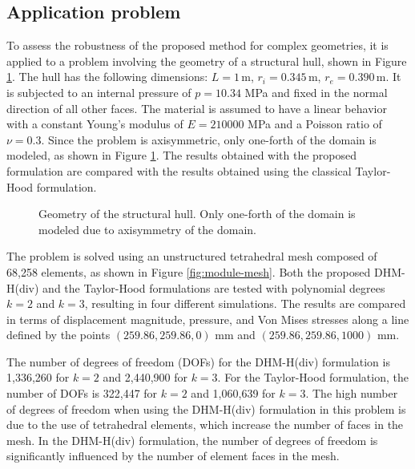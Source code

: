\documentclass[english,11pt,3p,number,sort&compress]{elsarticle}
\newcommand{\m}{\,\text{m}}
\begin{document}
\subsection{Application problem\label{subsec:module}}

To assess the robustness of the proposed method for complex geometries, it is applied to a problem involving the geometry of a structural hull, shown in Figure \ref{fig:module-geometry}. The hull has the following dimensions: $L=1\m$, $r_i=0.345\m$, $r_e=0.390\m$. It is subjected to an internal pressure of $p=10.34$ MPa and fixed in the normal direction of all other faces. The material is assumed to have a linear behavior with a constant Young's modulus of $E=210000$ MPa and a Poisson ratio of $\nu=0.3$. Since the problem is axisymmetric, only one-forth of the domain is modeled, as shown in Figure \ref{fig:module-geometry}. The results obtained with the proposed formulation are compared with the results obtained using the classical Taylor-Hood formulation.

\begin{figure}[h]
    \centering
    \def\svgwidth{450pt} 
    
    \caption{Geometry of the structural hull. Only one-forth of the domain is modeled due to axisymmetry of the domain.}
    \label{fig:module-geometry}
\end{figure}

The problem is solved using an unstructured tetrahedral mesh composed of 68,258 elements, as shown in Figure \ref{fig:module-mesh}. Both the proposed DHM-H(div) and the Taylor-Hood formulations are tested with polynomial degrees $k=2$ and $k=3$, resulting in four different simulations. The results are compared in terms of displacement magnitude, pressure, and Von Mises stresses along a line defined by the points $(259.86, 259.86, 0)$ mm and $(259.86, 259.86, 1000)$ mm. 

The number of degrees of freedom (DOFs) for the DHM-H(div) formulation is 1,336,260 for $k=2$ and 2,440,900 for $k=3$. For the Taylor-Hood formulation, the number of DOFs is 322,447 for $k=2$ and 1,060,639 for $k=3$. The high number of degrees of freedom when using the DHM-H(div) formulation in this problem is due to the use of tetrahedral elements, which increase the number of faces in the mesh. In the DHM-H(div) formulation, the number of degrees of freedom is significantly influenced by the number of element faces in the mesh.
\end{document}
